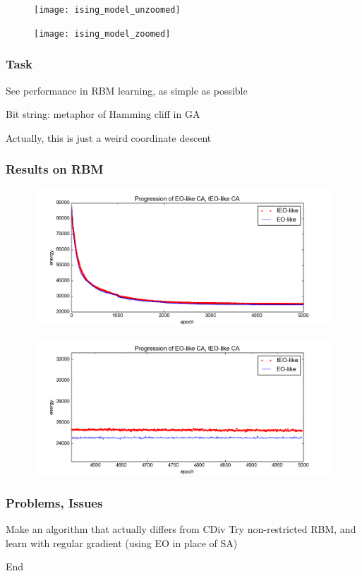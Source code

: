 \documentclass{beamer}
\begin{document}
\begin{frame}
\begin{figure}
  \end{figure}
  \begin{figure}
    \texttt{[image: ising\_model\_unzoomed]}
  \end{figure}
  \begin{figure}
    \texttt{[image: ising\_model\_zoomed]}
  \end{figure}
\end{frame}

\begin{frame}
  \frametitle{Task}
  See performance in RBM learning, as simple as possible

  Bit string: metaphor of Hamming cliff in GA

  Actually, this is just a weird coordinate descent
\end{frame}

\begin{frame}
  \frametitle{Results on RBM}
  \begin{figure}
    \includegraphics{eo_rbm_unzoomed}
  \end{figure}
  \begin{figure}
    \includegraphics{eo_rbm_zoomed}
  \end{figure}
\end{frame}

\begin{frame}
  \frametitle{Problems, Issues}
  Make an algorithm that actually differs from CDiv
  Try non-restricted RBM, and learn with regular gradient
  (using EO in place of SA)
\end{frame}

\begin{frame}
  End

\end{frame}
\end{document}
